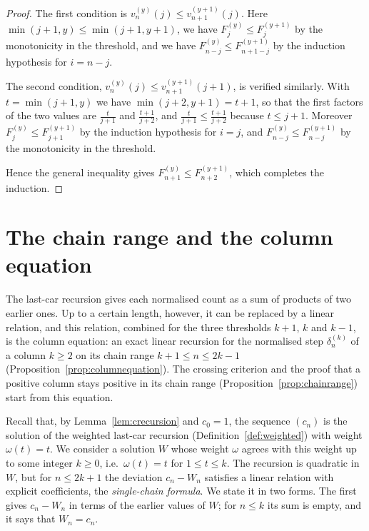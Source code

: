 \documentclass{amsart}
\makeatletter
\theoremstyle{definition}
\theoremstyle{remark}
\numberwithin{equation}{section}
\def\subsection{\@startsection{subsection}{2}\z@{.5\linespacing\@plus.7\linespacing}{-.5em}{\normalfont\bfseries\boldmath}}
\makeatother
\begin{document}
\begin{proof}
The first condition is $v^{(y)}_n(j)\le v^{(y+1)}_{n+1}(j)$. Here $\min(j+1,y)\le\min(j+1,y+1)$, we have $F^{(y)}_j\le F^{(y+1)}_j$ by the monotonicity in the threshold, and we have $F^{(y)}_{n-j}\le F^{(y+1)}_{n+1-j}$ by the induction hypothesis for $i=n-j$.

The second condition, $v^{(y)}_n(j)\le v^{(y+1)}_{n+1}(j+1)$, is verified similarly. With $t=\min(j+1,y)$ we have $\min(j+2,y+1)=t+1$, so that the first factors of the two values are $\frac{t}{j+1}$ and $\frac{t+1}{j+2}$, and $\frac{t}{j+1}\le\frac{t+1}{j+2}$ because $t\le j+1$. Moreover $F^{(y)}_j\le F^{(y+1)}_{j+1}$ by the induction hypothesis for $i=j$, and $F^{(y)}_{n-j}\le F^{(y+1)}_{n-j}$ by the monotonicity in the threshold.

Hence the general inequality gives $F^{(y)}_{n+1}\le F^{(y+1)}_{n+2}$, which completes the induction.
\end{proof}

\section{The chain range and the column equation}\label{sec:chain}
The last-car recursion gives each normalised count as a sum of products of two earlier ones. Up to a certain length, however, it can be replaced by a linear relation, and this relation, combined for the three thresholds $k+1$, $k$ and $k-1$, is the column equation: an exact linear recursion for the normalised step $\delta^{(k)}_n$ of a column $k\ge 2$ on its chain range $k+1\le n\le 2k-1$ (Proposition~\ref{prop:columnequation}). The crossing criterion and the proof that a positive column stays positive in its chain range (Proposition~\ref{prop:chainrange}) start from this equation.

\subsection{The single-chain formula}\label{subsec:chain-formula}

Recall that, by Lemma~\ref{lem:crecursion} and $c_0=1$, the sequence $(c_n)$ is the solution of the weighted last-car recursion (Definition~\ref{def:weighted}) with weight $\omega(t)=t$. We consider a solution $W$ whose weight $\omega$ agrees with this weight up to some integer $k\ge 0$, i.e.\ $\omega(t)=t$ for $1\le t\le k$. The recursion is quadratic in $W$, but for $n\le 2k+1$ the deviation $c_n-W_n$ satisfies a linear relation with explicit coefficients, the \emph{single-chain formula}. We state it in two forms. The first gives $c_n-W_n$ in terms of the earlier values of $W$; for $n\le k$ its sum is empty, and it says that $W_n=c_n$.
\end{document}
